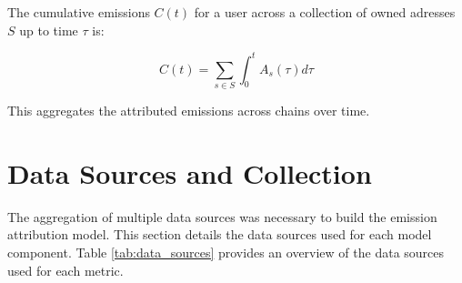 \documentclass[11pt]{report}
\begin{document}
The cumulative emissions $C(t)$ for a user across a collection of owned adresses $S$ up to time $\tau$ is:

\begin{equation}
    C(t) = \sum_{s \in S} \int_{0}^{t} A_s(\tau) d\tau
\end{equation}

This aggregates the attributed emissions across chains over time.

\section{Data Sources and Collection \label{sec:data_sources}}

The aggregation of multiple data sources was necessary to build the emission attribution model. This section details the data sources used for each model component. Table \ref{tab:data_sources} provides an overview of the data sources used for each metric.
\end{document}
